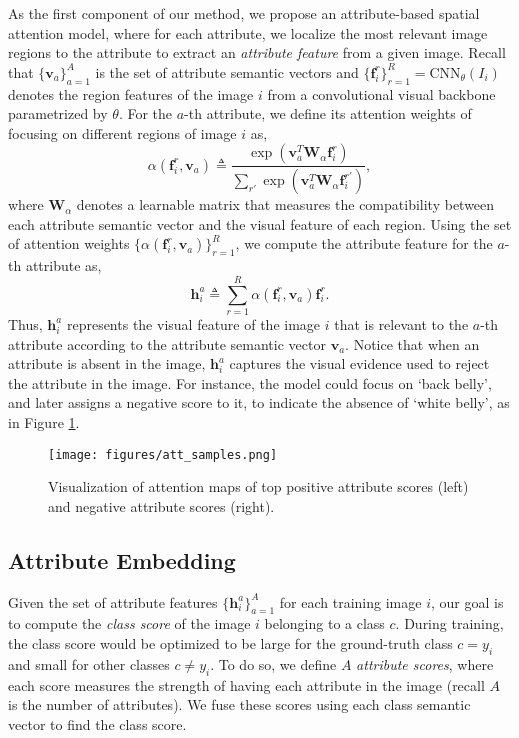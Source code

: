 \documentclass[10pt,journal,compsoc]{IEEEtran}
\newcommand{\f}{\boldsymbol{f}}
\newcommand{\h}{\boldsymbol{h}}
\newcommand{\W}{\boldsymbol{W}}
\renewcommand{\v}{\boldsymbol{v}}
\newcommand{\1}{\boldsymbol{1}}
\newcommand{\0}{\boldsymbol{0}}
\newcommand{\<}{\langle}
\renewcommand{\>}{\rangle}
\begin{document}
As the first component of our method, we propose an attribute-based spatial attention model, where for each attribute, we localize the most relevant image regions to the attribute to extract an \emph{attribute feature} from a given image.
Recall that $\{\v_a\}_{a = 1}^{A}$ is the set of attribute semantic vectors and $\{ \f_i^r \}_{r=1}^{R} = \text{CNN}_{\theta}(I_i)$ denotes the region features of the image $i$ from a convolutional visual backbone parametrized by $\theta$. For the $a$-th attribute, we define its attention weights of focusing on different regions of image $i$ as,
\begin{equation}
\label{eq:alpha_1}
\alpha(\f_i^r, \v_a) \triangleq \frac{\exp(\v_a^T \W_{\alpha} \f_i^r)}{\sum_{r'} \exp(\v_a^T \W_{\alpha} \f_i^{r'})},
\end{equation}
where $\W_{\alpha}$ denotes a learnable matrix that measures the compatibility between each attribute semantic vector and the visual feature of each region. Using the set of attention weights $\{\alpha(\f_i^r, \v_a)\}_{r=1}^{R}$, we compute the attribute feature for the $a$-th attribute as,
\begin{equation}
\label{eq:visual_attention}
\h^a_i \triangleq \sum_{r=1}^{R} \alpha(\f_i^r, \v_a) \f_i^r.
\end{equation}
Thus, $\h^a_i$ represents the visual feature of the image $i$ that is relevant to the $a$-th attribute according to the attribute semantic vector $\v_a$. Notice that when an attribute is absent in the image, $\h^a_i$ captures the visual evidence used to reject the attribute in the image. For instance, the model could focus on `back belly', and later assigns a negative score to it, to indicate the absence of `white belly', as in Figure \ref{fig:att_samples}.

\begin{figure}[t!]
\centering
\texttt{[image: figures/att\_samples.png]}
\vspace{-0mm}
\caption{
\small{
Visualization of attention maps of top positive attribute scores (left) and negative attribute scores (right).
}
}
\vspace{-10pt}
\label{fig:att_samples}
\end{figure}


\subsection{Attribute Embedding}
Given the set of attribute features $\{ \h^a_i\}_{a=1}^{A}$ for each training image $i$, our goal is to compute the \emph{class score} of the image $i$ belonging to a class $c$. During training, the class score would be optimized to be large for the ground-truth class $c = y_i$ and small for other classes $c \neq y_i$. To do so, we define $A$ \emph{attribute scores}, where each score measures the strength of having each attribute in the image (recall $A$ is the number of attributes). We fuse these scores using each class semantic vector to find the class score.
\end{document}
